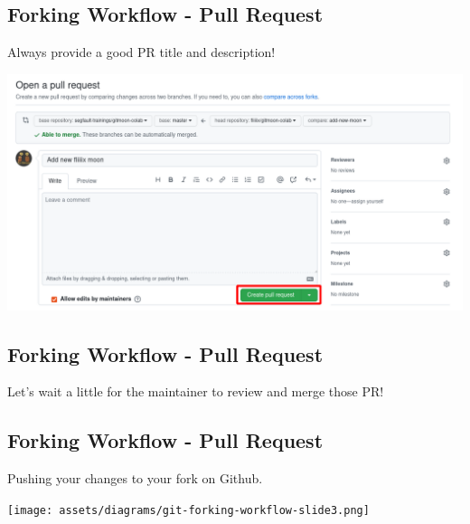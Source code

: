 \subsection{Forking Workflow - Pull Request}
\begin{frame}[fragile]
  \subslidetitle

  Always provide a good PR title and description!

  \vspace{1em}
  \centerline{\includegraphics[width=\textwidth]{../assets/images/github-pull-request-submit.png}}

\end{frame}

\subsection{Forking Workflow - Pull Request}
\begin{frame}[fragile]
  \subslidetitle

  \vspace{8em}
  \begin{center}
  Let's wait a little for the maintainer to review and merge those PR!
  \end{center}

\end{frame}

\subsection{Forking Workflow - Pull Request}
\begin{frame}[fragile]
  \subslidetitle
  Pushing your changes to your fork on Github.

  \vspace{2em}
  \centerline{\texttt{[image: assets/diagrams/git-forking-workflow-slide3.png]}}

\end{frame}

